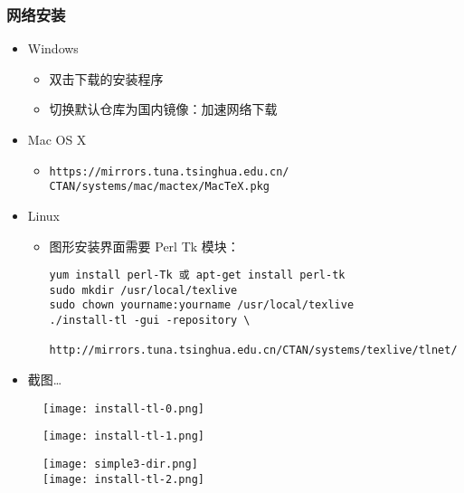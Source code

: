 \begin{frame}[fragile]
  \frametitle{网络安装}
  \begin{itemize}
    \item Windows
      \begin{itemize}
        \item 双击下载的安装程序
        \item 切换默认仓库为国内镜像：加速网络下载
      \end{itemize}
    \item Mac OS X
      \begin{itemize}
        \item \texttt{https://mirrors.tuna.tsinghua.edu.cn/\\CTAN/systems/mac/mactex/MacTeX.pkg}
      \end{itemize}
    \item Linux
      \begin{itemize}
        \item 图形安装界面需要 Perl Tk 模块：
          \begin{lstlisting}
yum install perl-Tk 或 apt-get install perl-tk
sudo mkdir /usr/local/texlive
sudo chown yourname:yourname /usr/local/texlive
./install-tl -gui -repository \
  http://mirrors.tuna.tsinghua.edu.cn/CTAN/systems/texlive/tlnet/
        \end{lstlisting}
      \end{itemize}
\item 截图\dots
\end{itemize}
\end{frame}

\begin{frame}
  \begin{figure}[h]
    \centering
    \texttt{[image: install-tl-0.png]}
  \end{figure}
\end{frame}

\begin{frame}
  \begin{figure}[h]
    \centering
    \texttt{[image: install-tl-1.png]}
  \end{figure}
\end{frame}

\begin{frame}
  \begin{figure}[h]
    \centering
    \texttt{[image: simple3-dir.png]}\\
    \texttt{[image: install-tl-2.png]}
  \end{figure}
\end{frame}

